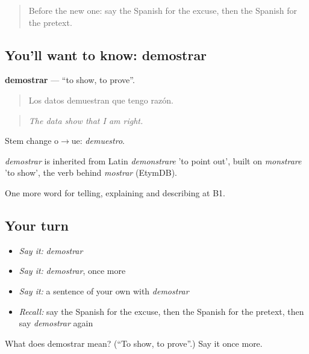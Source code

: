 \label{lesson:ES-C586-demostrar}



\begin{quote}
Before the new one: say the Spanish for the excuse, then the Spanish for the pretext.
\end{quote}

\subsection*{You'll want to know: demostrar}
\textbf{demostrar} — \textquotedblleft{}to show, to prove\textquotedblright{}.

\begin{quote}
Los datos demuestran que tengo razón.
\end{quote}

\begin{quote}
\emph{The data show that I am right.}
\end{quote}

Stem change o$\to$ue: \emph{demuestro}.

\begin{cousinweb}
\emph{demostrar} is inherited from Latin \emph{demonstrare} 'to point out', built on \emph{monstrare} 'to show', the verb behind \emph{mostrar} (EtymDB).
\end{cousinweb}

\begin{grammarlens}[title={What you've built}]
One more word for telling, explaining and describing at B1.
\end{grammarlens}

\subsection*{Your turn}
\begin{itemize}
\raggedright
  \item \emph{Say it:} \emph{demostrar}
  \item \emph{Say it:} \emph{demostrar}, once more
  \item \emph{Say it:} a sentence of your own with \emph{demostrar}
  \item \emph{Recall:} say the Spanish for the excuse, then the Spanish for the pretext, then say \emph{demostrar} again
\end{itemize}

\begin{tcolorbox}[breakable,colback=teal!4,colframe=teal!35!black,title={Before you move on}]
What does demostrar mean? (\textquotedblleft{}To show, to prove\textquotedblright{}.) Say it once more.
\end{tcolorbox}
